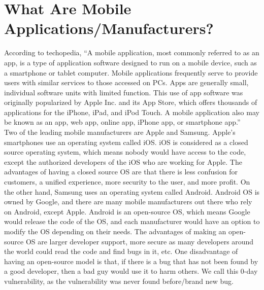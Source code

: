 \documentclass{article}
\begin{document}
\section{What Are Mobile Applications/Manufacturers?}
According to techopedia, “A mobile application, most commonly referred to as an app, is a type of application software designed to run on a mobile device, such as a smartphone or tablet computer. Mobile applications frequently serve to provide users with similar services to those accessed on PCs. Apps are generally small, individual software units with limited function. This use of app software was originally popularized by Apple Inc. and its App Store, which offers thousands of applications for the iPhone, iPad, and iPod Touch. A mobile application also may be known as an app, web app, online app, iPhone app, or smartphone app.” \\
Two of the leading mobile manufacturers are Apple and Samsung. Apple’s smartphones use an operating system called iOS. iOS is considered as a closed source operating system, which means nobody would have access to the code, except the authorized developers of the iOS who are working for Apple. The advantages of having a closed source OS are that there is less confusion for customers, a unified experience, more security to the user, and more profit. On the other hand, Samsung uses an operating system called Android. Android OS is owned by Google, and there are many mobile manufacturers out there who rely on Android, except Apple. Android is an open-source OS, which means Google would release the code of the OS, and each manufacturer would have an option to modify the OS depending on their needs. The advantages of making an open-source OS are larger developer support, more secure as many developers around the world could read the code and find bugs in it, etc. One disadvantage of having an open-source model is that, if there is a bug that has not been found by a good developer, then a bad guy would use it to harm others. We call this 0-day vulnerability, as the vulnerability was never found before/brand new bug.
\vspace{100mm}
\end{document}
